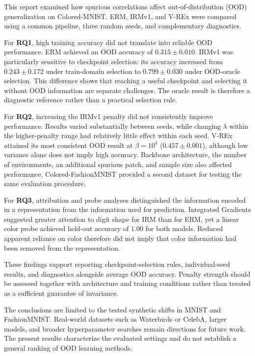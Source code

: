\documentclass[12pt,a4paper]{article}
\begin{document}
This report examined how spurious correlations affect out-of-distribution
(OOD) generalization on Colored-MNIST. ERM, IRMv1, and V-REx were compared
using a common pipeline, three random seeds, and complementary diagnostics.

For \textbf{RQ1}, high training accuracy did not translate into reliable OOD
performance. ERM achieved an OOD accuracy of $0.315\pm0.010$. IRMv1 was
particularly sensitive to checkpoint selection: its accuracy increased from
$0.243\pm0.172$ under train-domain selection to $0.799\pm0.030$ under
OOD-oracle selection. This difference shows that reaching a useful checkpoint
and selecting it without OOD information are separate challenges. The oracle
result is therefore a diagnostic reference rather than a practical selection rule.

For \textbf{RQ2}, increasing the IRMv1 penalty did not consistently improve
performance. Results varied substantially between seeds, while changing
$\lambda$ within the higher-penalty range had relatively little effect within
each seed. V-REx attained its most consistent OOD result at $\beta=10^4$
($0.457\pm0.001$), although low variance alone does not imply high accuracy.
Backbone architecture, the number of environments, an additional spurious
patch, and sample size also affected performance. Colored-FashionMNIST
provided a second dataset for testing the same evaluation procedure.

For \textbf{RQ3}, attribution and probe analyses distinguished the information
encoded in a representation from the information used for prediction.
Integrated Gradients suggested greater attention to digit shape for IRM than
for ERM, yet a linear color probe achieved held-out accuracy of $1.00$ for
both models. Reduced apparent reliance on color therefore did not imply that
color information had been removed from the representation.

These findings support reporting checkpoint-selection rules, individual-seed
results, and diagnostics alongside average OOD accuracy. Penalty strength
should be assessed together with architecture and training conditions rather
than treated as a sufficient guarantee of invariance.

The conclusions are limited to the tested synthetic shifts in MNIST and
FashionMNIST. Real-world datasets such as Waterbirds or CelebA, larger models,
and broader hyperparameter searches remain directions for future work.
The present results characterize the evaluated settings and do not establish
a general ranking of OOD learning methods.
\end{document}
